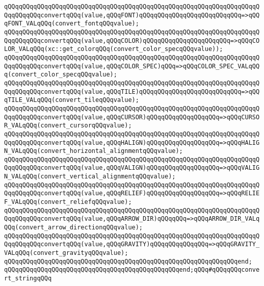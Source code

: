 \verb|qQQqqQQqqQQqqQQqqQQqqQQqqQQqqQQqqQQqqQQqqQQqqQQqqQQqqQQqqQQqqQQqqQQqqQQqqQQqqQQqconvertqQQq(value,qQQqFONT)qQQqqQQqqQQqqQQqqQQqqQQqqQQq=>qQQqFONT_VALqQQq(convert_fontqQQqvalue);|\newline
\verb|qQQqqQQqqQQqqQQqqQQqqQQqqQQqqQQqqQQqqQQqqQQqqQQqqQQqqQQqqQQqqQQqqQQqqQQqqQQqqQQqconvertqQQq(value,qQQqCOLOR)qQQqqQQqqQQqqQQqqQQqqQQq=>qQQqCOLOR_VALqQQq(xc::get_colorqQQq(convert_color_specqQQqvalue));|\newline
\verb|qQQqqQQqqQQqqQQqqQQqqQQqqQQqqQQqqQQqqQQqqQQqqQQqqQQqqQQqqQQqqQQqqQQqqQQqqQQqqQQqconvertqQQq(value,qQQqCOLOR_SPEC)qQQq=>qQQqCOLOR_SPEC_VALqQQq(convert_color_specqQQqvalue);|\newline
\verb|qQQqqQQqqQQqqQQqqQQqqQQqqQQqqQQqqQQqqQQqqQQqqQQqqQQqqQQqqQQqqQQqqQQqqQQqqQQqqQQqconvertqQQq(value,qQQqTILE)qQQqqQQqqQQqqQQqqQQqqQQqqQQq=>qQQqTILE_VALqQQq(convert_tileqQQqvalue);|\newline
\verb|qQQqqQQqqQQqqQQqqQQqqQQqqQQqqQQqqQQqqQQqqQQqqQQqqQQqqQQqqQQqqQQqqQQqqQQqqQQqqQQqconvertqQQq(value,qQQqCURSOR)qQQqqQQqqQQqqQQqqQQq=>qQQqCURSOR_VALqQQq(convert_cursorqQQqvalue);|\newline
\verb|qQQqqQQqqQQqqQQqqQQqqQQqqQQqqQQqqQQqqQQqqQQqqQQqqQQqqQQqqQQqqQQqqQQqqQQqqQQqqQQqconvertqQQq(value,qQQqHALIGN)qQQqqQQqqQQqqQQqqQQq=>qQQqHALIGN_VALqQQq(convert_horizontal_alignmentqQQqvalue);|\newline
\verb|qQQqqQQqqQQqqQQqqQQqqQQqqQQqqQQqqQQqqQQqqQQqqQQqqQQqqQQqqQQqqQQqqQQqqQQqqQQqqQQqconvertqQQq(value,qQQqVALIGN)qQQqqQQqqQQqqQQqqQQq=>qQQqVALIGN_VALqQQq(convert_vertical_alignmentqQQqvalue);|\newline
\verb|qQQqqQQqqQQqqQQqqQQqqQQqqQQqqQQqqQQqqQQqqQQqqQQqqQQqqQQqqQQqqQQqqQQqqQQqqQQqqQQqconvertqQQq(value,qQQqRELIEF)qQQqqQQqqQQqqQQqqQQq=>qQQqRELIEF_VALqQQq(convert_reliefqQQqvalue);|\newline
\verb|qQQqqQQqqQQqqQQqqQQqqQQqqQQqqQQqqQQqqQQqqQQqqQQqqQQqqQQqqQQqqQQqqQQqqQQqqQQqqQQqconvertqQQq(value,qQQqARROW_DIR)qQQqqQQq=>qQQqARROW_DIR_VALqQQq(convert_arrow_directionqQQqvalue);|\newline
\verb|qQQqqQQqqQQqqQQqqQQqqQQqqQQqqQQqqQQqqQQqqQQqqQQqqQQqqQQqqQQqqQQqqQQqqQQqqQQqqQQqconvertqQQq(value,qQQqGRAVITY)qQQqqQQqqQQqqQQq=>qQQqGRAVITY_VALqQQq(convert_gravityqQQqvalue);|\newline
\verb|qQQqqQQqqQQqqQQqqQQqqQQqqQQqqQQqqQQqqQQqqQQqqQQqqQQqqQQqqQQqqQQqend;|\newline
\newline
\verb|qQQqqQQqqQQqqQQqqQQqqQQqqQQqqQQqqQQqqQQqqQQqqQQqend;qQQq#qQQqqQQqconvert_stringqQQq|\newline
